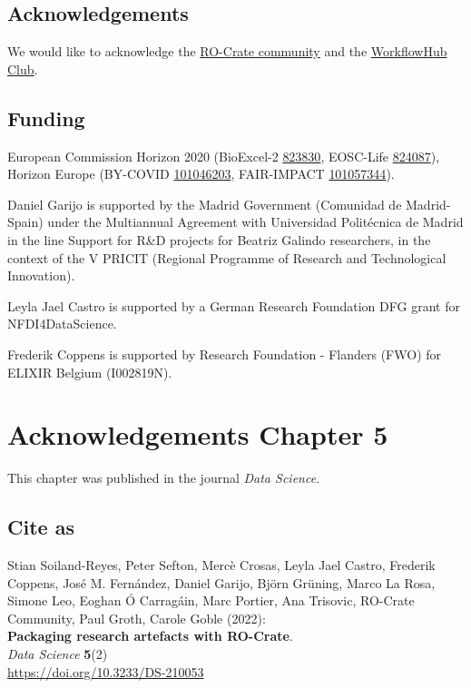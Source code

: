 \hypertarget{acknowledgements-1}{%
\subsection*{Acknowledgements}\label{acknowledgements-1}}

We would like to acknowledge the
\href{https://www.researchobject.org/ro-crate/community.html}{RO-Crate
community} and the
\href{https://about.workflowhub.eu/project/acknowledgements/}{WorkflowHub
Club}.

\hypertarget{funding-1}{%
\subsection*{Funding}\label{funding-1}}

European Commission Horizon 2020 (BioExcel-2
\href{https://cordis.europa.eu/project/id/823830}{823830}, EOSC-Life
\href{https://cordis.europa.eu/project/id/824087}{824087}), Horizon
Europe (BY-COVID
\href{https://cordis.europa.eu/project/id/101046203}{101046203},
FAIR-IMPACT
\href{https://cordis.europa.eu/project/id/101057344}{101057344}).

Daniel Garijo is supported by the Madrid Government (Comunidad de
Madrid-Spain) under the Multiannual Agreement with Universidad
Politécnica de Madrid in the line Support for R\&D projects for Beatriz
Galindo researchers, in the context of the V PRICIT (Regional Programme
of Research and Technological Innovation).

Leyla Jael Castro is supported by a German Research Foundation DFG grant
for NFDI4DataScience.

Frederik Coppens is supported by Research Foundation - Flanders (FWO)
for ELIXIR Belgium (I002819N).



\section{Acknowledgements Chapter 5}

This chapter was published in the journal \emph{Data Science}.

\subsection*{Cite as}

Stian Soiland-Reyes, Peter Sefton, Mercè Crosas, Leyla Jael Castro,
Frederik Coppens, José M. Fernández, Daniel Garijo, Björn Grüning, Marco
La Rosa, Simone Leo, Eoghan Ó Carragáin, Marc Portier, Ana Trisovic,
RO-Crate Community, Paul Groth, Carole Goble (2022):\\
\textbf{Packaging research artefacts with RO-Crate}.\\
\emph{Data Science} \textbf{5}(2)\\
\url{https://doi.org/10.3233/DS-210053}

